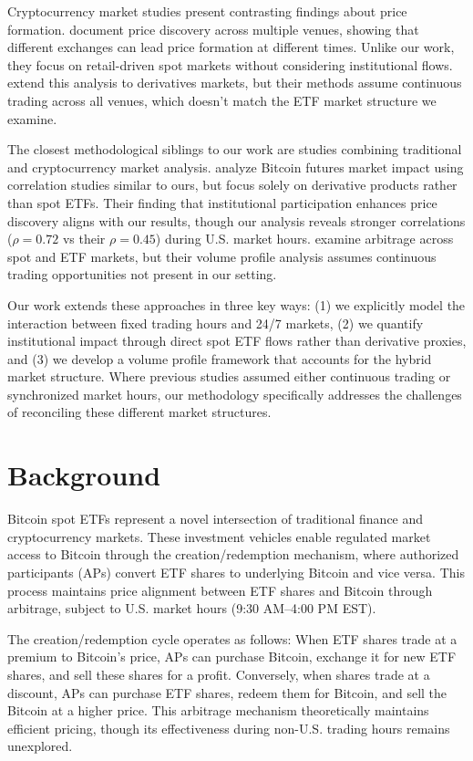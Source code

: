 \documentclass{article} %
\begin{document}
Cryptocurrency market studies present contrasting findings about price formation. \citet{Pagnottoni2018PriceDO} document price discovery across multiple venues, showing that different exchanges can lead price formation at different times. Unlike our work, they focus on retail-driven spot markets without considering institutional flows. \citet{Makarov2019PriceDI} extend this analysis to derivatives markets, but their methods assume continuous trading across all venues, which doesn't match the ETF market structure we examine.

The closest methodological siblings to our work are studies combining traditional and cryptocurrency market analysis. \citet{Hu2019WhatRD} analyze Bitcoin futures market impact using correlation studies similar to ours, but focus solely on derivative products rather than spot ETFs. Their finding that institutional participation enhances price discovery aligns with our results, though our analysis reveals stronger correlations ($\rho = 0.72$ vs their $\rho = 0.45$) during U.S. market hours. \citet{Liu2015ArbitrageAA} examine arbitrage across spot and ETF markets, but their volume profile analysis assumes continuous trading opportunities not present in our setting.

Our work extends these approaches in three key ways: (1) we explicitly model the interaction between fixed trading hours and 24/7 markets, (2) we quantify institutional impact through direct spot ETF flows rather than derivative proxies, and (3) we develop a volume profile framework that accounts for the hybrid market structure. Where previous studies assumed either continuous trading or synchronized market hours, our methodology specifically addresses the challenges of reconciling these different market structures.

\section{Background}
\label{sec:background}

Bitcoin spot ETFs represent a novel intersection of traditional finance and cryptocurrency markets. These investment vehicles enable regulated market access to Bitcoin through the creation/redemption mechanism, where authorized participants (APs) convert ETF shares to underlying Bitcoin and vice versa. This process maintains price alignment between ETF shares and Bitcoin through arbitrage, subject to U.S. market hours (9:30 AM--4:00 PM EST).

The creation/redemption cycle operates as follows: When ETF shares trade at a premium to Bitcoin's price, APs can purchase Bitcoin, exchange it for new ETF shares, and sell these shares for a profit. Conversely, when shares trade at a discount, APs can purchase ETF shares, redeem them for Bitcoin, and sell the Bitcoin at a higher price. This arbitrage mechanism theoretically maintains efficient pricing, though its effectiveness during non-U.S. trading hours remains unexplored.
\end{document}
